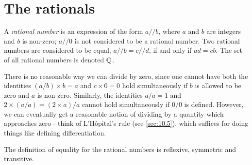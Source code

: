 \section{The rationals}\label{sec:4.2}

\begin{defn}\label{4.2.1}
  A \emph{rational number} is an expression of the form \(a // b\), where \(a\) and \(b\) are integers and \(b\) is non-zero;
  \(a // 0\) is not considered to be a rational number.
  Two rational numbers are considered to be equal, \(a // b = c // d\), if and only if \(ad = cb\).
  The set of all rational numbers is denoted \(\mathbb{Q}\).
\end{defn}

\begin{note}
  There is no reasonable way we can divide by zero, since one cannot have both the identities \((a / b) \times b = a\) and \(c \times 0 = 0\) hold simultaneously if \(b\) is allowed to be zero and \(a\) is non-zero.
  Similarly, the identities \(a / a = 1\) and \(2 \times (a / a) = (2 \times a) / a\) cannot hold simultaneously if \(0 / 0\) is defined.
  However, we can eventually get a reasonable notion of dividing by a quantity which approaches zero
  - think of L'H\^opital's rule (see \cref{sec:10.5}), which suffices for doing things like defining differentiation.
\end{note}

\begin{ac}\label{ac:4.2.1}
  The definition of equality for the rational numbers is reflexive, symmetric and transitive.
\end{ac}

